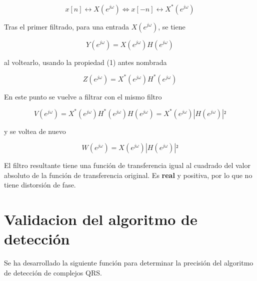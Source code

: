 \documentclass[12pt]{article}
\begin{document}
\begin{equation}
x[n]\leftrightarrow X(e^{j\omega}) \Leftrightarrow x[-n]\leftrightarrow X^*(e^{j\omega})
\end{equation}

Tras el primer filtrado, para una entrada $X(e^{j\omega})$, se tiene

$$Y(e^{j\omega}) = X(e^{j\omega})H(e^{j\omega})$$

al voltearlo, usando la propiedad (1) antes nombrada

$$Z(e^{j\omega}) = X^*(e^{j\omega})H^*(e^{j\omega})$$

En este punto se vuelve a filtrar con el mismo filtro

$$V(e^{j\omega}) = X^*(e^{j\omega})H^*(e^{j\omega})H(e^{j\omega}) = X^*(e^{j\omega})|H(e^{j\omega})|²$$

y se voltea de nuevo

$$W(e^{j\omega}) = X(e^{j\omega})|H(e^{j\omega})|²$$

El filtro resultante tiene una función de transferencia igual al cuadrado del valor absoluto de la función de transferencia original. Es \textbf{real} y positiva, por lo que no tiene distorsión de fase.

\section{Validacion del algoritmo de detección}
Se ha desarrollado la siguiente función para determinar la precisión del algoritmo de detección de complejos QRS.\\


\end{document}
